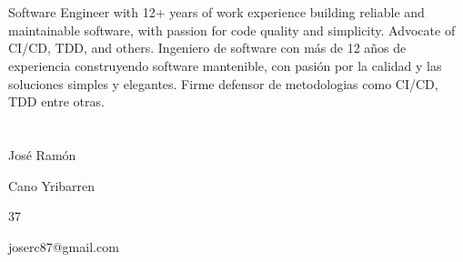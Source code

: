 \maketitle

\section{\ml{}{}} 

{\ml
{
Software Engineer with 12+ years of work experience building reliable and
maintainable software, with passion for code quality and simplicity. Advocate
of CI/CD, TDD, and others.
}
{
Ingeniero de software con más de 12 años de experiencia construyendo software
mantenible, con pasión por la calidad y las soluciones simples y elegantes.
Firme defensor de metodologias como CI/CD, TDD entre otras.
}
}

\section{} 

\cvitem
    {}
    {José Ramón}

\cvitem
    {}
    {Cano Yribarren}

\cvitem
    {}
    {}

\cvitem
    {}
    {}

\cvitem
    {}
    {37}

\cvitem
    {}
    {joserc87@gmail.com}
